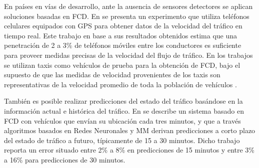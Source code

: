 En países en vías de desarrollo, ante la ausencia de sensores detectores se aplican soluciones basadas en FCD. En \citep{herrera2010evaluation} se presenta un experimento que utiliza teléfonos celulares equipados con GPS para obtener datos de la velocidad del tráfico en tiempo real. Este trabajo en base a sus  resultados obtenidos estima que una penetración de 2 a 3\% de teléfonos móviles entre los conductores es suficiente para proveer medidas precisas de la velocidad del flujo de tráfico. En los trabajos  \citep{reinthaler2007evaluation, sevlian2010travel,li2007practical} se utilizan taxis como vehículos de prueba para la obtención de FCD, bajo el supuesto de que las medidas de velocidad provenientes de los taxis son representativas de la velocidad promedio de toda la población de vehículos \citep{linauer2004fleet}. 

También es posible realizar predicciones del estado del tráfico basándose en la información actual e histórica del tráfico. En \citep{de2008traffic} se describe un sistema basado en FCD con vehículos que envían su ubicación cada tres minutos, y que a través algoritmos basados en Redes Neuronales y MM derivan predicciones a corto plazo del estado de tráfico a futuro, típicamente de 15 a 30 minutos. Dicho trabajo reporta un error situado entre 2\% a 8\% en predicciones de 15 minutos y entre 3\% a 16\% para predicciones de 30 minutos.